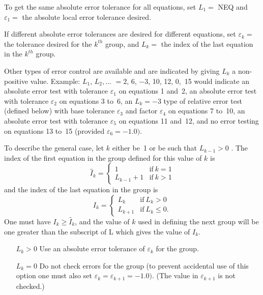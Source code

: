 \documentclass[twoside]{MATH77}
\begin{document}
\begin{itemize}
To get the same absolute error tolerance for all equations, set $L_1=$ NEQ
and $\varepsilon _1=$ the absolute local error tolerance desired.

If different absolute error tolerances are desired for different equations,
set $\varepsilon _k=$ the tolerance desired for the $k^{th}$ group,
and $L_k=$ the index of the last equation in the $k^{th}$ group.

Other types of error control are available and are indicated by giving $L_k$
a non-positive value. Example: $L_1$, $L_2,..$. $=2$, 6, $-$3, 10, 12, 0,~15
would indicate an absolute error test with tolerance $\varepsilon _1$ on
equations 1 and~2, an absolute error test with tolerance $\varepsilon _2$ on
equations 3 to~6, an $L_k=-3$ type of relative error test (defined below)
with base tolerance $\varepsilon _3$ and factor $\varepsilon _4$ on
equations 7 to~10, an absolute error test with tolerance $\varepsilon _5$ on
equations 11 and~12, and no error testing on equations 13 to~15 (provided $%
\varepsilon _6=-1.0).$

To describe the general case, let $k$ either be~1 or be such that $L_{k-1}>0$%
. The index of the first equation in the group defined for this value of $k$
is%
\begin{equation*}
\hat I_k=\begin{cases}
1 & \text{if}\ k=1 \\
L_{k-1}+1 & \text{if}\ k>1
\end{cases}
\end{equation*}
and the index of the last equation in the group is%
\begin{equation*}
I_k=\begin{cases}
L_k & \text{if}\ L_k>0 \\
L_{k+1} & \text{if}\ L_k\leq 0.
\end{cases}
\end{equation*}
One must have $I_k\geq \hat I_k$, and the value of $k$ used in defining the
next group will be one greater than the subscript of L which gives the value
of $I_k$.

\begin{itemize}
\item[$L_k>0$]  Use an absolute error tolerance of $\varepsilon _k$ for the
group.

\item[$L_k=0$]  Do not check errors for the group (to prevent accidental use
of this option one must also set $\varepsilon_k = \varepsilon_{k+1}=-1.0)$.
(The value in $\varepsilon_{k+1}$ is not checked.)


\end{itemize}
\end{itemize}
\end{document}
